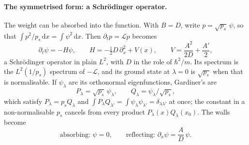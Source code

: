 \documentclass[11pt]{article}
\numberwithin{equation}{section}
\newcommand{\dd}{\mathrm{d}}
\begin{document}
\paragraph{The symmetrised form: a Schr\"odinger operator.} The weight can be absorbed into the function. With
$B=D$, write $p=\sqrt{p_s}\,\psi$, so that $\int p^2/p_s\,\dd x=\int\psi^2\,\dd x$. Then $\partial_tp=\mathcal Lp$
becomes
\begin{equation}
  \partial_t\psi=-H\psi,\qquad H=-\tfrac12D\,\partial_x^2+V(x),\qquad V=\frac{A^2}{2D}+\frac{A'}{2},
  \label{eq:schrodinger}
\end{equation}
a Schr\"odinger operator in plain $L^2$, with $D$ in the role of $\hbar^2/m$. Its spectrum is the
$L^2(1/p_s)$ spectrum of $-\mathcal L$, and its ground state at $\lambda=0$ is $\sqrt{p_s}$ when that is
normalisable. If $\psi_\lambda$ are its orthonormal eigenfunctions, Gardiner's are
\begin{equation}
  P_\lambda=\sqrt{p_s}\,\psi_\lambda,\qquad Q_\lambda=\psi_\lambda/\sqrt{p_s},
  \label{eq:PQ-psi}
\end{equation}
which satisfy $P_\lambda=p_sQ_\lambda$ and $\int P_\lambda Q_{\lambda'}=\int\psi_\lambda\psi_{\lambda'}=\delta_{\lambda\lambda'}$
at once; the constant in a non-normalisable $p_s$ cancels from every product $P_\lambda(x)Q_\lambda(x_0)$. The walls become
\begin{equation}
  \text{absorbing: }\psi=0,\qquad \text{reflecting: }\partial_x\psi=\frac{A}{D}\,\psi .
  \label{eq:schrodinger-walls}
\end{equation}
\end{document}

